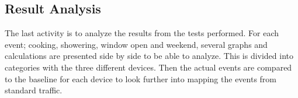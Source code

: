 \subsection{Result Analysis}
The last activity is to analyze the results from the tests performed. For each event; cooking, showering, window open and weekend, several graphs and calculations are presented side by side to be able to analyze. This is divided into categories with the three different devices. Then the actual events are compared to the baseline for each device to look further into mapping the events from standard traffic. 